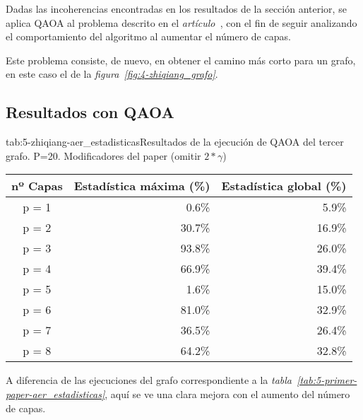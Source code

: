 Dadas las incoherencias encontradas en los resultados de la sección anterior, se aplica QAOA al problema descrito en el \textit{artículo~\cite{solving_shortest_path_with_qaoa}}, con el fin de seguir analizando el comportamiento del algoritmo al aumentar el número de capas.

Este problema consiste, de nuevo, en obtener el camino más corto para un grafo, en este caso el de la \textit{figura~\ref{fig:4-zhiqiang_grafo}}.

\subsection{Resultados con QAOA}
\begin{table}[htbp]{tab:5-zhiqiang-aer_estadisticas}{Resultados de la ejecución de QAOA del tercer grafo. P=20. Modificadores del paper (omitir \(2*\gamma\))}
  \centering
  \begin{tabular}{|c|r|r|}
    \hline
    \textbf{nº Capas} & \textbf{Estadística máxima (\%)} & \textbf{Estadística global (\%)} \\ \hline
    p = 1             &  0.6\%                           &  5.9\% \\ \hline
    p = 2             & 30.7\%                           & 16.9\% \\ \hline
    p = 3             & 93.8\%                           & 26.0\% \\ \hline
    p = 4             & 66.9\%                           & 39.4\% \\ \hline  %
    p = 5             &  1.6\%                           & 15.0\% \\ \hline  %
    p = 6             & 81.0\%                           & 32.9\% \\ \hline
    p = 7             & 36.5\%                           & 26.4\% \\ \hline
    p = 8             & 64.2\%                           & 32.8\% \\ \hline
  \end{tabular}
\end{table}

A diferencia de las ejecuciones del grafo correspondiente a la \textit{tabla~\ref{tab:5-primer-paper-aer_estadisticas}}, aquí se ve una clara mejora con el aumento del número de capas.

